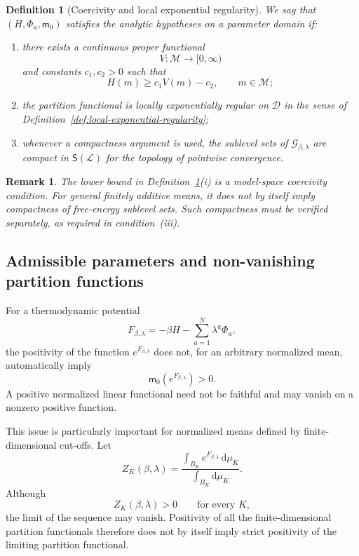 \documentclass[10pt,a4paper]{amsart}
\newtheorem{Definition}[Theorem]{Definition}
\newtheorem{rem}[Theorem]{Remark}
\begin{document}
\begin{Definition}[Coercivity and local exponential regularity]
\label{def:coercive}
We say that $(H,\Phi_a,\mathsf m_0)$ satisfies the analytic hypotheses
on a parameter domain if:
\begin{enumerate}
\item[\textup{(i)}] there exists a continuous proper functional
\[
V\colon\mathcal M\longrightarrow[0,\infty)
\]
and constants $c_1,c_2>0$ such that
\[
H(m)\geq c_1V(m)-c_2,
\qquad
m\in\mathcal M;
\]
\item[\textup{(ii)}] the partition functional is locally exponentially
regular on $\mathcal D$ in the sense of
Definition~\ref{def:local-exponential-regularity};
\item[\textup{(iii)}] whenever a compactness argument is used, the
sublevel sets of $\mathcal G_{\beta,\lambda}$ are compact in
$\mathsf S(\mathcal L)$ for the topology of pointwise convergence.
\end{enumerate}
\end{Definition}

\begin{rem}
The lower bound in Definition~\ref{def:coercive}\textup{(i)} is a
model-space coercivity condition. For general finitely additive means,
it does not by itself imply compactness of free-energy sublevel sets.
Such compactness must be verified separately, as required in
condition~\textup{(iii)}.
\end{rem}

\subsection{Admissible parameters and non-vanishing partition functions}
\label{subsec:admissible-partition}

For a thermodynamic potential
\[
F_{\beta,\lambda}
=
-\beta H-\sum_{a=1}^{N}\lambda^a\Phi_a,
\]
the positivity of the function $e^{F_{\beta,\lambda}}$ does not, for an
arbitrary normalized mean, automatically imply
\[
\mathsf m_0(e^{F_{\beta,\lambda}})>0.
\]
A positive normalized linear functional need not be faithful and may
vanish on a nonzero positive function.

This issue is particularly important for normalized means defined by
finite-dimensional cut-offs. Let
\[
Z_K(\beta,\lambda)
=
\frac{
\displaystyle
\int_{B_K}
e^{F_{\beta,\lambda}}\,\mathrm d\mu_K
}{
\displaystyle
\int_{B_K}\mathrm d\mu_K
}.
\]
Although
\[
Z_K(\beta,\lambda)>0
\qquad
\text{for every }K,
\]
the limit of the sequence may vanish. Positivity of all the
finite-dimensional partition functionals therefore does not by itself
imply strict positivity of the limiting partition functional.
\end{document}

